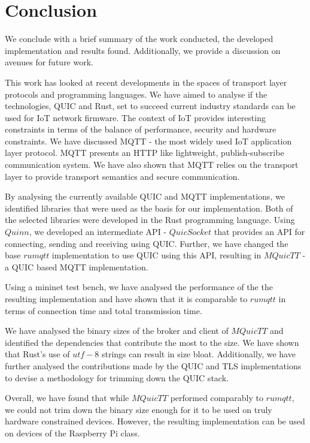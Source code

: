 \chapter{Conclusion} \label{chap:conclusion}

We conclude with a brief summary of the work conducted, the developed implementation and results found.
Additionally, we provide a discussion on avenues for future work.

This work has looked at recent developments in the spaces of transport layer protocols and programming languages.
We have aimed to analyse if the technologies, QUIC and Rust, set to succeed current industry standards can be used for IoT network firmware.
The context of IoT provides interesting constraints in terms of the balance of performance, security and hardware constraints.
We have discussed MQTT - the most widely used IoT application layer protocol.
MQTT presents an HTTP like lightweight, publish-subscribe communication system.
We have also shown that MQTT relies on the transport layer to provide transport semantics and secure communication.

By analysing the currently available QUIC and MQTT implementations, we identified libraries that were used as the basis for our implementation.
Both of the selected libraries were developed in the Rust programming language.
Using $Quinn$, we developed an intermediate API - $QuicSocket$ that provides an API for connecting, sending and receiving using QUIC.
Further, we have changed the base $rumqtt$ implementation to use QUIC using this API, resulting in $MQuicTT$ - a QUIC based MQTT implementation.

Using a mininet test bench, we have analysed the performance of the the resulting implementation and have shown that it is comparable to $rumqtt$ in terms of connection time and total transmission time.

We have analysed the binary sizes of the broker and client of $MQuicTT$ and identified the dependencies that contribute the most to the size.
We have shown that Rust's use of $utf-8$ strings can result in size bloat.
Additionally, we have further analysed the contributions made by the QUIC and TLS implementations to devise a methodology for trimming down the QUIC stack.

Overall, we have found that while $MQuicTT$ performed comparably to $rumqtt$, we could not trim down the binary size enough for it to be used on truly hardware constrained devices.
However, the resulting implementation can be used on devices of the Raspberry Pi class.

